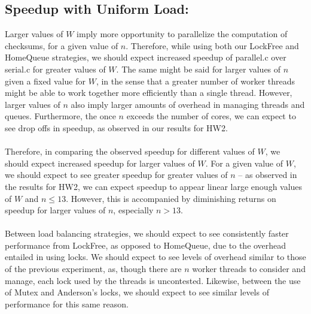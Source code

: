 \documentclass[]{article}
\begin{document}
\subsection{Speedup with Uniform Load:}
Larger values of $W$ imply more opportunity to parallelize the computation of checksums, for a given value of $n$. Therefore, while using both our LockFree and HomeQueue strategies,  we should expect increased speedup of parallel.c over serial.c for greater values of $W$. The same might be said for larger values of $n$ given a fixed value for $W$, in the sense that a greater number of worker threads might be able to work together more efficiently than a single thread. However, larger values of $n$ also imply larger amounts of overhead in managing threads and queues. Furthermore, the once $n$ exceeds the number of cores, we can expect to see drop offs in speedup, as observed in our results for HW2.
\\\\
Therefore, in comparing the observed speedup for different values of $W$, we should expect increased speedup for larger values of $W$. For a given value of $W$, we should expect to see greater speedup for greater values of $n$ -- as observed in the results for HW2, we can expect speedup to appear linear large enough values of $W$ and $n \leq 13$. However, this is accompanied by diminishing returns on speedup for larger values of $n$, especially $n > 13$.
\\\\
Between load balancing strategies, we should expect to see consistently faster performance from LockFree, as opposed to HomeQueue, due to the overhead entailed in using locks. We should expect to see levels of overhead similar to those of the previous experiment, as, though there are $n$ worker threads to consider and manage, each lock used by the threads is uncontested. Likewise, between the use of Mutex and Anderson's locks, we should expect to see similar levels of performance for this same reason.
\end{document}
